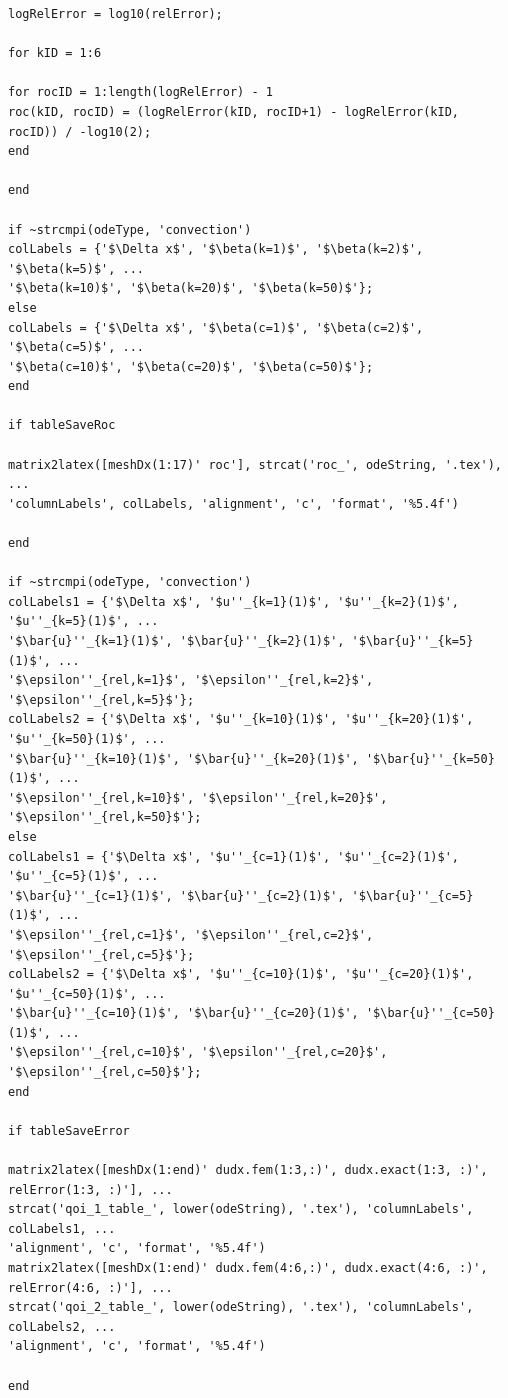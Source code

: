 \documentclass[10pt]{article}		%
\numberwithin{equation}{section}
\begin{document}
\begin{lstlisting}
logRelError = log10(relError);

for kID = 1:6

for rocID = 1:length(logRelError) - 1
roc(kID, rocID) = (logRelError(kID, rocID+1) - logRelError(kID, rocID)) / -log10(2);
end

end

if ~strcmpi(odeType, 'convection')
colLabels = {'$\Delta x$', '$\beta(k=1)$', '$\beta(k=2)$', '$\beta(k=5)$', ...
'$\beta(k=10)$', '$\beta(k=20)$', '$\beta(k=50)$'};
else
colLabels = {'$\Delta x$', '$\beta(c=1)$', '$\beta(c=2)$', '$\beta(c=5)$', ...
'$\beta(c=10)$', '$\beta(c=20)$', '$\beta(c=50)$'};
end

if tableSaveRoc

matrix2latex([meshDx(1:17)' roc'], strcat('roc_', odeString, '.tex'), ...
'columnLabels', colLabels, 'alignment', 'c', 'format', '%5.4f')

end

if ~strcmpi(odeType, 'convection')
colLabels1 = {'$\Delta x$', '$u''_{k=1}(1)$', '$u''_{k=2}(1)$', '$u''_{k=5}(1)$', ...
'$\bar{u}''_{k=1}(1)$', '$\bar{u}''_{k=2}(1)$', '$\bar{u}''_{k=5}(1)$', ...
'$\epsilon''_{rel,k=1}$', '$\epsilon''_{rel,k=2}$', '$\epsilon''_{rel,k=5}$'};
colLabels2 = {'$\Delta x$', '$u''_{k=10}(1)$', '$u''_{k=20}(1)$', '$u''_{k=50}(1)$', ...
'$\bar{u}''_{k=10}(1)$', '$\bar{u}''_{k=20}(1)$', '$\bar{u}''_{k=50}(1)$', ...
'$\epsilon''_{rel,k=10}$', '$\epsilon''_{rel,k=20}$', '$\epsilon''_{rel,k=50}$'};
else
colLabels1 = {'$\Delta x$', '$u''_{c=1}(1)$', '$u''_{c=2}(1)$', '$u''_{c=5}(1)$', ...
'$\bar{u}''_{c=1}(1)$', '$\bar{u}''_{c=2}(1)$', '$\bar{u}''_{c=5}(1)$', ...
'$\epsilon''_{rel,c=1}$', '$\epsilon''_{rel,c=2}$', '$\epsilon''_{rel,c=5}$'};
colLabels2 = {'$\Delta x$', '$u''_{c=10}(1)$', '$u''_{c=20}(1)$', '$u''_{c=50}(1)$', ...
'$\bar{u}''_{c=10}(1)$', '$\bar{u}''_{c=20}(1)$', '$\bar{u}''_{c=50}(1)$', ...
'$\epsilon''_{rel,c=10}$', '$\epsilon''_{rel,c=20}$', '$\epsilon''_{rel,c=50}$'};
end

if tableSaveError

matrix2latex([meshDx(1:end)' dudx.fem(1:3,:)', dudx.exact(1:3, :)', relError(1:3, :)'], ...
strcat('qoi_1_table_', lower(odeString), '.tex'), 'columnLabels', colLabels1, ...
'alignment', 'c', 'format', '%5.4f')
matrix2latex([meshDx(1:end)' dudx.fem(4:6,:)', dudx.exact(4:6, :)', relError(4:6, :)'], ...
strcat('qoi_2_table_', lower(odeString), '.tex'), 'columnLabels', colLabels2, ...
'alignment', 'c', 'format', '%5.4f')

end
\end{lstlisting}
\end{document}
